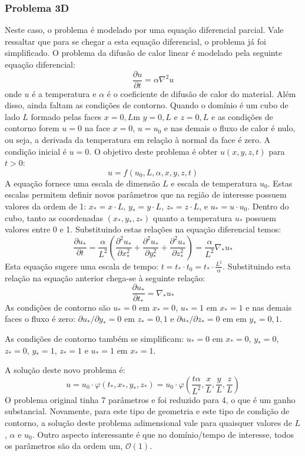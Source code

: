 \documentclass[article,12pt,oneside,a4paper,english,brazil,sumario=tradicional]{abntex2}
\newcommand{\pd}{\ensuremath{\partial}}
\begin{document}
\subsubsection{Problema 3D}
Neste caso, o problema é modelado por uma equação diferencial parcial. Vale ressaltar que para se chegar a esta equação diferencial, o problema já foi simplificado. O problema da difusão de calor linear é modelado pela seguinte equação diferencial:
\[
\frac{\partial u}{\partial t} = \alpha\nabla^2 u
\]
onde $u$ é a temperatura e $\alpha$ é o coeficiente de difusão de calor do material. Além disso, ainda faltam as condições de contorno. Quando o domínio é um cubo de lado $L$ formado pelas faces $x=0,L$m $y=0,L$ e $z=0,L$ e as condições de contorno forem $u=0$ na face $x=0$, $u=u_0$ e nas demais o fluxo de calor é nulo, ou seja, a derivada da temperatura em relação à normal da face é zero. A condição inicial é $u=0$. O objetivo deste problema é obter $u(x,y,z,t)$ para $t>0$:
\[
u = f(u_0, L, \alpha, x, y, z, t)
\]
A equação fornece uma escala de dimensão $L$ e escala de temperatura $u_0$. Estas escalas permitem definir novos parâmetros que na região de interesse possuem valores da ordem de 1: $x_* = x\cdot L$, $y_* = y\cdot L$, $z_* = z\cdot L$, e $u_* = u\cdot u_0$. Dentro do cubo, tanto as coordenadas $(x_*, y_*, z_*)$ quanto a temperatura $u_*$  possuem valores entre 0 e 1. Substituindo estas relações na equação diferencial temos:
\[
\frac{\pd u_*}{\pd t} = \frac{\alpha}{L^2}\left(\frac{\pd^2 u_*}{\pd x_*^2} + \frac{\pd^2 u_*}{\pd y_*^2} + \frac{\pd^2 u_*}{\pd z_*^2} \right) = \frac{\alpha}{L^2} \nabla_* u_*
\]
Esta equação sugere uma escala de tempo: $t = t_*\cdot t_0 = t_* \cdot \frac{L^2}{\alpha}$. Substituindo esta relação na equação anterior chega-se à seguinte relação:
\[
\frac{\pd u_*}{\pd t_*} =\nabla_* u_*
\]
As condições de contorno são $u_*=0$ em $x_*=0$, $u_*=1$ em $x_*=1$ e nas demais faces o fluxo é zero: $\pd u_*/\pd y_* = 0$ em $z_*=0,1$ e $\pd u_*/\pd z_* = 0$ em em $y_*=0,1$.


As condições de contorno também se simplificam: $u_*=0$ em $x_*=0$, $y_*=0$, $z_*=0$, $y_*=1$, $z_*=1$ e $u_* = 1$ em $x_* = 1$. 

A solução deste novo problema é:
\[
u = u_0 \cdot \varphi(t_*, x_*, y_*, z_*) = u_0\cdot\varphi\left(\frac{t\alpha}{L^2}, \frac{x}{L}, 
 \frac{y}{L} , \frac{z}{L}\right)
\]
O problema original tinha 7 parâmetros e foi reduzido para 4, o que é um ganho substancial. Novamente, para este tipo de geometria e este tipo de condição de contorno, a solução deste problema adimensional vale para quaisquer valores de $L$, $\alpha$ e $u_0$. Outro aspecto interessante é que no domínio/tempo de interesse, todos os parâmetros são da ordem um, $\mathcal{O}(1)$.
\end{document}
